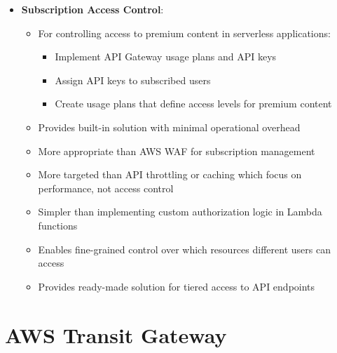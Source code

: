 \documentclass[11pt,a4paper]{report}
\begin{document}
\begin{itemize}
\begin{itemize}
  \item Eliminates exposure to the public internet for sensitive file transfers
  \item More secure than using NAT gateways which still route traffic over the internet
  \item More cost-effective and appropriate than Direct Connect for internal AWS service communications
  \item Simple to implement by moving instances to private subnets and creating the VPC endpoint
\end{itemize}
  \item \textbf{Subscription Access Control}:
\begin{itemize}
  \item For controlling access to premium content in serverless applications:
\begin{itemize}
  \item Implement API Gateway usage plans and API keys
  \item Assign API keys to subscribed users
  \item Create usage plans that define access levels for premium content
\end{itemize}
  \item Provides built-in solution with minimal operational overhead
  \item More appropriate than AWS WAF for subscription management
  \item More targeted than API throttling or caching which focus on performance, not access control
  \item Simpler than implementing custom authorization logic in Lambda functions
  \item Enables fine-grained control over which resources different users can access
  \item Provides ready-made solution for tiered access to API endpoints
\end{itemize}
\end{itemize}

\section{AWS Transit Gateway}
\end{document}
